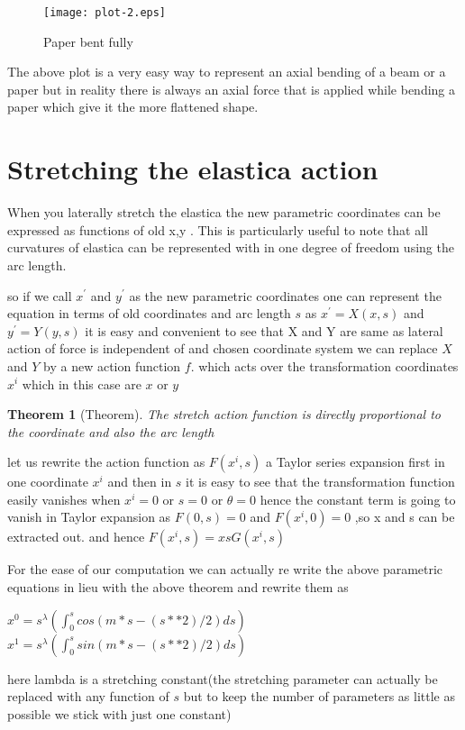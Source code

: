 \documentclass[longbibliography]{revtex4-1}
\begin{document}
\begin{figure}
\centering
\texttt{[image: plot-2.eps]}
\caption{Paper bent fully}
\end{figure}

The above plot is a very easy way to represent an axial bending of a beam or a paper but in reality there is always an axial force that is applied while bending a paper which give it the more flattened shape.

\section{Stretching the elastica action}
When you laterally stretch the elastica the new parametric coordinates can be expressed as functions of old x,y . This is particularly useful to note that all curvatures of elastica can be represented with in one degree of freedom using the arc length.

so if we call $x^{'}$ and $y^{'}$ as the new parametric coordinates one can represent the equation in terms of old coordinates and arc length $s$ as $x^{'} =  X(x,s)$ and $y^{'} = Y(y,s)$ it is easy and convenient to see that X and Y are same as lateral action of force is independent of and chosen coordinate system  we can replace $X$ and $Y$ by a new action function $f$. which acts over the transformation coordinates $x^{i}$ which in this case are $x$ or $y$

\newtheorem{thm}{Theorem}
\begin{thm}[Theorem]
The stretch action function is directly proportional to the coordinate and also the arc length
\end{thm}

let us rewrite the action function as $F(x^{i},s)$ a Taylor series expansion first in one coordinate $x^{i}$ and then in $s$
it is easy to see that the transformation function easily vanishes when $x^{i}=0$ or $s=0$ or $\theta=0$
hence the constant term is going to vanish in Taylor expansion as $F(0,s)=0$ and $F(x^{i},0)=0$ ,so x and s can be extracted out.
and hence $F(x^{i},s) = xsG(x^{i},s)$

For the ease of our computation we can actually re write the above parametric equations in lieu with the above theorem and rewrite them as

 $x^{0}= s^{\lambda} (\int_{0}^{s} cos(m*s-(s**2)/2) ds)$ 
 $x^{1}= s^{\lambda} (\int_{0}^{s} sin(m*s-(s**2)/2) ds)$ 

 here lambda is a stretching constant(the stretching parameter can actually be replaced with any function of $s$ but to keep the number of parameters as little as possible we stick with just one constant)
\end{document}
